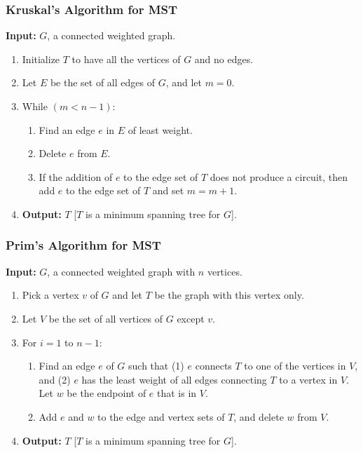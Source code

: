 \documentclass{article}
\theoremstyle{plain}
\theoremstyle{definition}
\theoremstyle{remark}
\begin{document}
\subsubsection*{Kruskal's Algorithm for MST}
\textbf{Input:} $G$, a connected weighted graph.
\begin{enumerate}[label=\arabic*.]
    \item Initialize $T$ to have all the vertices of $G$ and no edges.
    \item Let $E$ be the set of all edges of $G$, and let $m = 0$.
    \item While $(m < n - 1)$:
    \begin{enumerate}[label=(\alph*)]
        \item Find an edge $e$ in $E$ of least weight.
        \item Delete $e$ from $E$.
        \item If the addition of $e$ to the edge set of $T$ does not produce a circuit, then add $e$ to the edge set of $T$ and set $m = m + 1$.
    \end{enumerate}
    \item \textbf{Output:} $T$ [$T$ is a minimum spanning tree for $G$].
\end{enumerate}

\subsubsection*{Prim's Algorithm for MST}
\textbf{Input:} $G$, a connected weighted graph with $n$ vertices.
\begin{enumerate}[label=\arabic*.]
    \item Pick a vertex $v$ of $G$ and let $T$ be the graph with this vertex only.
    \item Let $V$ be the set of all vertices of $G$ except $v$.
    \item For $i = 1$ to $n - 1$:
    \begin{enumerate}[label=(\alph*)]
        \item Find an edge $e$ of $G$ such that (1) $e$ connects $T$ to one of the vertices in $V$, and (2) $e$ has the least weight of all edges connecting $T$ to a vertex in $V$. Let $w$ be the endpoint of $e$ that is in $V$.
        \item Add $e$ and $w$ to the edge and vertex sets of $T$, and delete $w$ from $V$.
    \end{enumerate}
    \item \textbf{Output:} $T$ [$T$ is a minimum spanning tree for $G$].
\end{enumerate}
\end{document}
